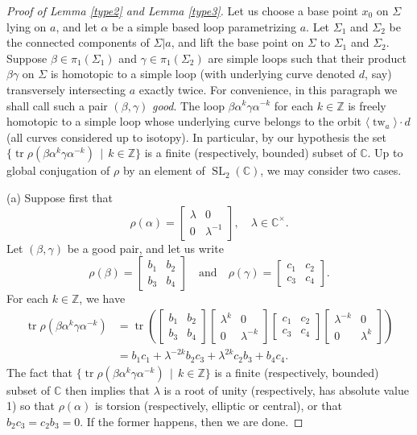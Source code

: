 \documentclass[reqno]{amsart}
\theoremstyle{plain}
\theoremstyle{definition}
\theoremstyle{remark}
\newcommand{\C}{{\mathbb{C}}}
\newcommand{\Z}{{\mathbb{Z}}}
\DeclareMathOperator{\SL}{SL}
\DeclareMathOperator{\tw}{tw}
\DeclareMathOperator{\tr}{tr}
\begin{document}
\begin{proof}[Proof of Lemma \ref{type2} and Lemma \ref{type3}]
Let us choose a base point $x_0$ on $\Sigma$ lying on $a$, and let $\alpha$ be a simple based loop 
parametrizing $a$. Let $\Sigma_1$ and $\Sigma_2$ be the connected components of $\Sigma|a$, and lift the base 
point on $\Sigma$ to $\Sigma_1$ and $\Sigma_2$. Suppose $\beta\in\pi_1(\Sigma_1)$ and 
$\gamma\in\pi_1(\Sigma_2)$ are simple loops such that their product $\beta\gamma$ on $\Sigma$ is homotopic to a 
simple loop (with underlying curve denoted $d$, say) transversely intersecting $a$ exactly twice. For 
convenience, in this paragraph we shall call such a pair $(\beta,\gamma)$ \emph{good}. The loop 
$\beta\alpha^k\gamma\alpha^{-k}$ for each $k\in\Z$ is freely homotopic to a simple loop whose underlying curve 
belongs to the orbit $\langle\tw_a\rangle\cdot d$ (all curves considered up to isotopy). In particular, by our 
hypothesis the set $\{\tr\rho(\beta\alpha^k\gamma\alpha^{-k})\,\mid\,k\in\Z\}$ is a finite (respectively, 
bounded) subset of $\C$. Up to global conjugation of $\rho$ by an element of $\SL_2(\C)$, we may consider two 
cases.

(a) Suppose first that
	$$\rho(\alpha)=\begin{bmatrix}\lambda & 0 \\ 0 &\lambda^{-1}\end{bmatrix},\quad \lambda\in\C^\times.$$
	Let $(\beta,\gamma)$ be a good pair, and let us write
$$\rho(\beta)=\begin{bmatrix} b_1 & b_2\\ b_3 & b_4\end{bmatrix}\quad\text{and}\quad \rho(\gamma)=\begin{bmatrix} c_1 & c_2\\ c_3 & c_4\end{bmatrix}.$$
	For each $k\in\Z$, we have
	\begin{align*}\tr\rho(\beta\alpha^k\gamma\alpha^{-k})&=\tr\left(\begin{bmatrix}b_1 & b_2\\ b_3 & b_4\end{bmatrix}\begin{bmatrix}\lambda^k &0 \\ 0 & \lambda^{-k}\end{bmatrix}\begin{bmatrix}c_1 & c_2\\ c_3 & c_4\end{bmatrix}\begin{bmatrix}\lambda^{-k} &0 \\ 0 & \lambda^{k}\end{bmatrix}\right)\\
	&=b_1c_1+\lambda^{-2k}b_2c_3+\lambda^{2k}c_2b_3+b_4c_4.
	\end{align*}
The fact that $\{\tr\rho(\beta\alpha^k\gamma\alpha^{-k})\,\mid\,k\in\Z\}$ is a finite (respectively, bounded) subset of $\C$ then implies that $\lambda$ is a root of unity (respectively, has absolute value 1) so that $\rho(\alpha)$ is torsion (respectively, elliptic or central), or that $b_2c_3=c_2b_3=0$. If the former happens, then we are done.


\end{proof}
\end{document}
